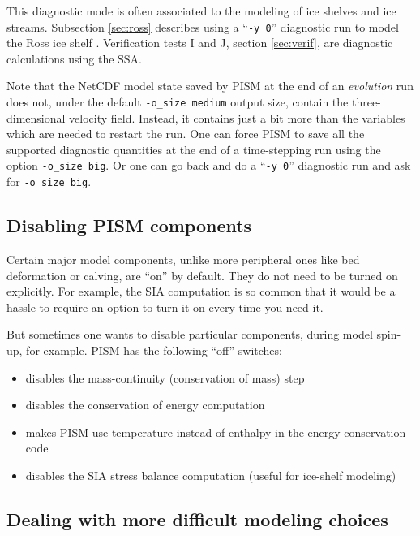 This diagnostic mode is often associated to the modeling of ice shelves and ice streams.  Subsection \ref{sec:ross} describes using a ``\texttt{-y 0}'' diagnostic run to model the Ross ice shelf \cite{MacAyealetal}.  Verification tests I and J, section \ref{sec:verif}, are diagnostic calculations using the SSA.

Note that the NetCDF model state saved by PISM at the end of an \emph{evolution} run does not, under the default \texttt{-o_size medium} output size, contain the three-dimensional velocity field.  Instead, it contains just a bit more than the variables which are needed to restart the run.  One can  force PISM to save all the supported diagnostic quantities at the end of a time-stepping run using the option \texttt{-o_size big}.  Or one can go back and do a ``\texttt{-y 0}'' diagnostic run and ask for \texttt{-o_size big}.


\subsection{Disabling PISM components}
\label{sec:turning-off}

Certain major model components, unlike more peripheral ones like bed deformation or calving, are ``on'' by default.  They do not need to be turned on explicitly.  For example, the SIA computation is so common that it would be a hassle to require an option to turn it on every time you need it.

But sometimes one wants to disable particular components, during model spin-up, for example.  PISM has the following ``off'' switches:
\begin{itemize}
\item {} disables the mass-continuity (conservation of mass) step
\item {} disables the conservation of energy computation
\item {} makes PISM use temperature instead of enthalpy in the energy conservation code
\item {} disables the SIA stress balance computation (useful for ice-shelf modeling)
\end{itemize}


\subsection{Dealing with more difficult modeling choices}
\label{subsec:hard-choices}

